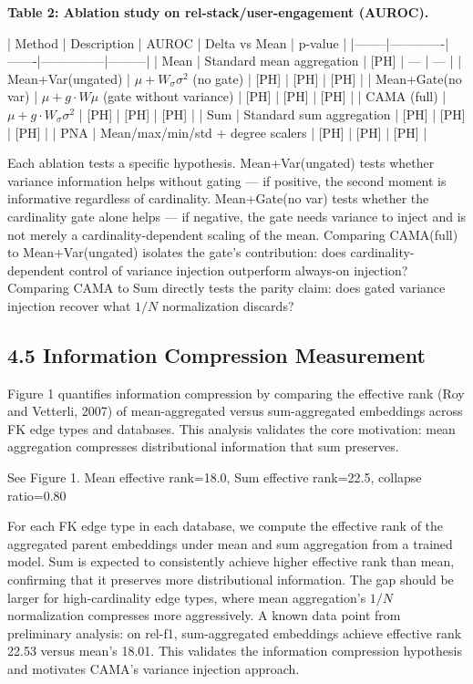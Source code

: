 \documentclass[final]{article}
\begin{document}
\textbf{Table 2: Ablation study on rel-stack/user-engagement (AUROC).}

| Method | Description | AUROC | Delta vs Mean | p-value |
|--------|-------------|-------|---------------|---------|
| Mean | Standard mean aggregation | [PH] | --- | --- |
| Mean+Var(ungated) | $\mu + W_\sigma \sigma^2$ (no gate) | [PH] | [PH] | [PH] |
| Mean+Gate(no var) | $\mu + g \cdot W \mu$ (gate without variance) | [PH] | [PH] | [PH] |
| CAMA (full) | $\mu + g \cdot W_\sigma \sigma^2$ | [PH] | [PH] | [PH] |
| Sum | Standard sum aggregation | [PH] | [PH] | [PH] |
| PNA | Mean/max/min/std + degree scalers | [PH] | [PH] | [PH] |

Each ablation tests a specific hypothesis. Mean+Var(ungated) tests whether variance information helps without gating --- if positive, the second moment is informative regardless of cardinality. Mean+Gate(no var) tests whether the cardinality gate alone helps --- if negative, the gate needs variance to inject and is not merely a cardinality-dependent scaling of the mean. Comparing CAMA(full) to Mean+Var(ungated) isolates the gate's contribution: does cardinality-dependent control of variance injection outperform always-on injection? Comparing CAMA to Sum directly tests the parity claim: does gated variance injection recover what $1/N$ normalization discards?

\subsection{4.5 Information Compression Measurement}

Figure 1 quantifies information compression by comparing the effective rank (Roy and Vetterli, 2007) of mean-aggregated versus sum-aggregated embeddings across FK edge types and databases. This analysis validates the core motivation: mean aggregation compresses distributional information that sum preserves.

See Figure 1. Mean effective rank=18.0, Sum effective rank=22.5, collapse ratio=0.80



For each FK edge type in each database, we compute the effective rank of the aggregated parent embeddings under mean and sum aggregation from a trained model. Sum is expected to consistently achieve higher effective rank than mean, confirming that it preserves more distributional information. The gap should be larger for high-cardinality edge types, where mean aggregation's $1/N$ normalization compresses more aggressively. A known data point from preliminary analysis: on rel-f1, sum-aggregated embeddings achieve effective rank 22.53 versus mean's 18.01. This validates the information compression hypothesis and motivates CAMA's variance injection approach.
\end{document}

